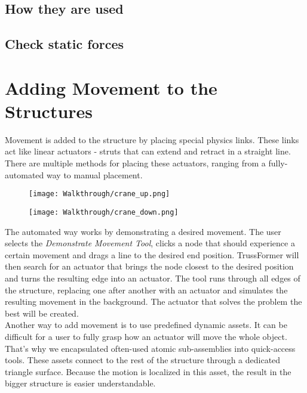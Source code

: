 \subsection{How they are used}

\subsection{Check static forces} 

\section{Adding Movement to the Structures}
Movement is added to the structure by placing special physics links. These links act like linear actuators - struts that can extend and retract in a straight line. There are multiple methods for placing these actuators, ranging from a fully-automated way to manual placement.
\begin{figure}
  \centering
  \begin{minipage}{.5\textwidth}
    \centering
    \texttt{[image: Walkthrough/crane\_up.png]}
    \label{fig:dino_up}
  \end{minipage}%
  \begin{minipage}{.5\textwidth}
    \centering
    \texttt{[image: Walkthrough/crane\_down.png]}
    \label{fig:dino_down}
  \end{minipage}
\end{figure}
The automated way works by demonstrating a desired movement. The user selects the \textit{Demonstrate Movement Tool}, clicks a node that should experience a certain movement and drags a line to the desired end position. TrussFormer will then search for an actuator that brings the node closest to the desired position and turns the resulting edge into an actuator. The tool runs through all edges of the structure, replacing one after another with an actuator and simulates the resulting movement in the background. The actuator that solves the problem the best will be created.\\
Another way to add movement is to use predefined dynamic assets. It can be difficult for a user to fully grasp how an actuator will move the whole object. That's why we encapsulated often-used atomic sub-assemblies into quick-access tools. These assets connect to the rest of the structure through a dedicated triangle surface. Because the motion is localized in this asset, the result in the bigger structure is easier understandable.\\
